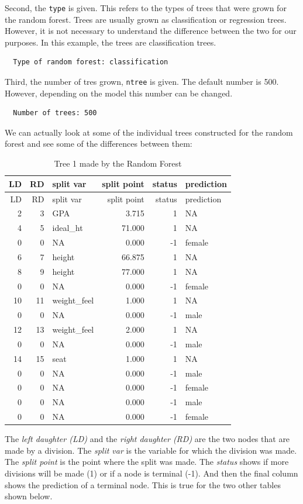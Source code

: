\documentclass[12pt,twoside]{reedthesis}
\begin{document}
  Second, the \texttt{type} is given. This refers to the types of trees
  that were grown for the random forest. Trees are usually grown as
  classification or regression trees. However, it is not necessary to
  understand the difference between the two for our purposes. In this
  example, the trees are classification trees.
  
  \begin{verbatim}
  Type of random forest: classification
  \end{verbatim}
  
  Third, the number of tres grown, \texttt{ntree} is given. The default
  number is 500. However, depending on the model this number can be
  changed.
  
  \begin{verbatim}
  Number of trees: 500
  \end{verbatim}
  
  We can actually look at some of the individual trees constructed for the
  random forest and see some of the differences between them:
  
  \newpage
  
  \begin{longtable}[c]{@{}rrlrrl@{}}
  \caption{Tree 1 made by the Random Forest}\tabularnewline
  \toprule
  LD & RD & split var & split point & status & prediction\tabularnewline
  \midrule
  \endfirsthead
  \toprule
  LD & RD & split var & split point & status & prediction\tabularnewline
  \midrule
  \endhead
  2 & 3 & GPA & 3.715 & 1 & NA\tabularnewline
  4 & 5 & ideal\_ht & 71.000 & 1 & NA\tabularnewline
  0 & 0 & NA & 0.000 & -1 & female\tabularnewline
  6 & 7 & height & 66.875 & 1 & NA\tabularnewline
  8 & 9 & height & 77.000 & 1 & NA\tabularnewline
  0 & 0 & NA & 0.000 & -1 & female\tabularnewline
  10 & 11 & weight\_feel & 1.000 & 1 & NA\tabularnewline
  0 & 0 & NA & 0.000 & -1 & male\tabularnewline
  12 & 13 & weight\_feel & 2.000 & 1 & NA\tabularnewline
  0 & 0 & NA & 0.000 & -1 & male\tabularnewline
  14 & 15 & seat & 1.000 & 1 & NA\tabularnewline
  0 & 0 & NA & 0.000 & -1 & male\tabularnewline
  0 & 0 & NA & 0.000 & -1 & female\tabularnewline
  0 & 0 & NA & 0.000 & -1 & male\tabularnewline
  0 & 0 & NA & 0.000 & -1 & female\tabularnewline
  \bottomrule
  \end{longtable}
  
  The \emph{left daughter (LD)} and the \emph{right daughter (RD)} are the
  two nodes that are made by a division. The \emph{split var} is the
  variable for which the division was made. The \emph{split point} is the
  point where the split was made. The \emph{status} shows if more
  divisions will be made (1) or if a node is terminal (-1). And then the
  final column shows the prediction of a terminal node. This is true for
  the two other tables shown below.
  
\end{document}
